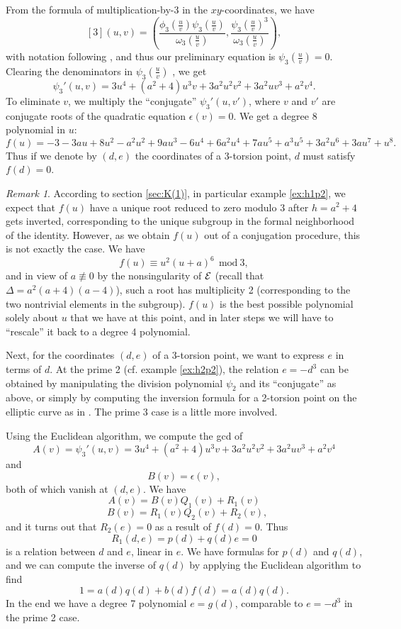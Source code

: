 \documentclass{gtpart}
\theoremstyle{definition}
\theoremstyle{remark}
\newtheorem{rmk}[thm]{Remark}
\begin{document}
From the formula of multiplication-by-3 in the $xy$-coordinates, we have
\[
 [3](u,v) = 
 \left(
 \frac{\phi_3(\frac{u}{v})\psi_3(\frac{u}{v})}{\omega_3(\frac{u}{v})},
 \frac{\psi_3(\frac{u}{v})^3}{\omega_3(\frac{u}{v})}\right),
\]
with notation following \cite[exercise 3.7(d)]{AEC}, and thus our 
preliminary equation is $\psi_3(\frac{u}{v}) = 0$.  Clearing the 
denominators in $\psi_3(\frac{u}{v})$ , we get 
\[
 \psi_3'(u,v) = 
 3u^4 + (a^2 + 4) u^3 v + 3a^2 u^2 v^2 + 3a^2 u v^3 + a^2 v^4.
\]
To eliminate $v$, we multiply the ``conjugate'' $\psi_3'(u,v')$, where 
$v$ and $v'$ are conjugate roots of the quadratic equation $\epsilon(v) = 0$.  We get a degree 8 polynomial in 
$u$:
\[
 f(u) = -3 - 3 a u + 8 u^2 - a^2 u^2 + 9 a u^3 - 6 u^4 + 6 a^2 u^4 + 
 7 a u^5 + a^3 u^5 + 3 a^2 u^6 + 3 a u^7 + u^8.
\]
Thus if we denote by $(d,e)$ the coordinates of a 3-torsion point, $d$ 
must satisfy $f(d) = 0$.  
\begin{rmk}
\label{rmk}
 According to section \ref{sec:K(1)}, in particular example 
 \ref{ex:h1p2}, we expect that $f(u)$ have a unique root reduced to zero 
 modulo 3 after $h = a^2 + 4$ gets inverted, corresponding to the unique 
 subgroup in the formal neighborhood of the identity.  However, as we obtain $f(u)$ out of a 
 conjugation procedure, this is not exactly the case.  We have 
 \[
  f(u) \equiv u^2 (u + a)^6~~\text{mod}~3,
 \]
 and in view of $a \not\equiv 0$ by the nonsingularity of $\cal E$ 
 (recall that $\Delta = a^2(a + 4)(a - 4)$), such a root has multiplicity 
 2 (corresponding to the two nontrivial elements in the subgroup).  
 $f(u)$ is the best possible polynomial solely about $u$ that we have at this 
 point, and in later steps we will have to ``rescale'' it 
 back to a degree 4 polynomial.  
\end{rmk}

Next, for the coordinates $(d,e)$ of a 3-torsion point, we want to 
express $e$ in terms of $d$.  At the prime 2 (cf. example \ref{ex:h2p2}), 
the relation $e = -d^3$ can be obtained by manipulating the 
division polynomial $\psi_2$ and its ``conjugate'' as above, or simply by 
computing the inversion formula for a 2-torsion point on the elliptic 
curve as in \cite[section 3]{h2p2}.  The prime 3 case is a little more involved.  

Using the Euclidean algorithm, we compute the gcd of 
\[
 A(v) = \psi_3'(u,v) = 3u^4 + (a^2 + 4) u^3 v + 3a^2 u^2 v^2 + 3a^2 u v^3 
 + a^2 v^4
\]
and 
\[
 B(v) = \epsilon(v),
\]
both of which vanish at $(d,e)$.  We have
\[
 A(v) = B(v)Q_1(v) + R_1(v)
\]
\[
 ~~~B(v) = R_1(v)Q_2(v) + R_2(v),
\]
and it turns out that $R_2(e) = 0$ as a result of $f(d) = 0$.  Thus
\[
 R_1(d,e) = p(d) + q(d) e = 0
\]
is a relation between $d$ and $e$, linear in $e$.  We have 
formulas for $p(d)$ and $q(d)$, and we can compute the inverse of $q(d)$ 
by applying the Euclidean algorithm to find 
\[
 1 = a(d)q(d) + b(d)f(d) = a(d)q(d).
\]
In the end we have a degree 7 polynomial $e = g(d)$, comparable to 
$e = -d^3$ in the prime 2 case.  
\end{document}

